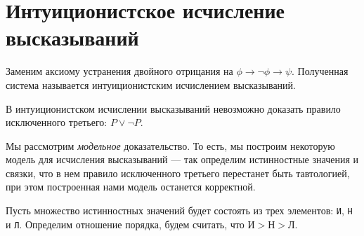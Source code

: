 %
%
%
%
%


\section{Интуиционистское исчисление высказываний}

Заменим аксиому устранения двойного отрицания
на $\phi \rightarrow \neg \phi \rightarrow \psi$.
Полученная система называется интуиционистским исчислением высказываний.

\begin{theorem}\label{no_third_excluded}
В интуиционистском исчислении высказываний невозможно доказать правило 
исключенного третьего: $P \vee \neg P$.
\end{theorem}

Мы рассмотрим \emph{модельное} доказательство. То есть, мы построим некоторую модель для
исчисления высказываний --- так определим истинностные значения и связки,
что в нем правило исключенного третьего перестанет быть тавтологией, при этом построенная
нами модель останется корректной. 

Пусть множество истинностных значений будет состоять из трех элементов: \texttt{И},
\texttt{Н} и \texttt{Л}. Определим отношение порядка, будем считать, что 
$\texttt{И} > \texttt{Н} > \texttt{Л}$.

